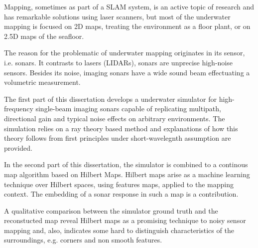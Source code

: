 Mapping, sometimes as part of a SLAM system, is an active topic of
research and has remarkable solutions using laser scanners, but most of the
underwater mapping is focused on 2D maps, treating the environment as a floor
plant, or on 2.5D maps of the seafloor.

The reason for the problematic of underwater mapping originates in its sensor,
i.e. sonars. It contrasts to lasers (LIDARs), sonars are
unprecise high-noise sensors. Besides its noise, imaging sonars have a wide
sound beam effectuating a volumetric measurement.

The first part of this dissertation develops a underwater simulator for
high-frequency single-beam imaging sonars capable of replicating multipath, directional
gain and typical noise effects on arbitrary environments. The simulation relies
on a ray theory based method and explanations of how this theory follows from
first principles under short-wavelegnth assumption are provided.

In the second part of this dissertation, the simulator is combined to a
continous map algorithm based on Hilbert Maps.
Hilbert maps arise as a machine learning technique over Hilbert spaces, using
features maps, applied to the mapping context. The embedding of a sonar response in
such a map is a contribution.

A qualitative comparison between the simulator ground truth and the reconstucted
map reveal Hilbert maps as a promising technique to noisy sensor mapping and,
also, indicates some hard to distinguish characteristics of the surroundings,
e.g. corners and non smooth features.


